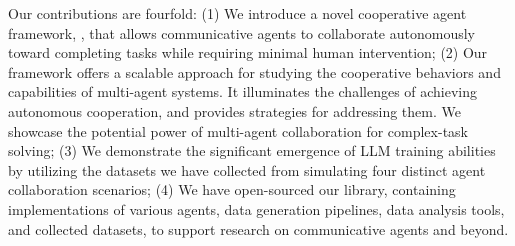  Our contributions are fourfold:
(1) We introduce a novel cooperative agent framework, \RP, that allows communicative agents to collaborate autonomously toward completing tasks while requiring minimal human intervention;
(2) Our framework offers a scalable approach for studying the cooperative behaviors and capabilities of multi-agent systems. It illuminates the challenges of achieving autonomous cooperation, and provides strategies for addressing them. We showcase the potential power of multi-agent collaboration for complex-task solving;
(3) We demonstrate the significant emergence of LLM training abilities by utilizing the datasets we have collected from simulating four distinct agent collaboration scenarios;
(4) We have open-sourced our library, containing implementations of various agents, data generation pipelines, data analysis tools, and collected datasets, to support research on communicative agents and beyond.
